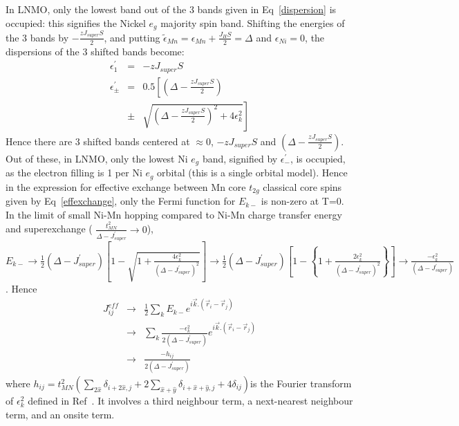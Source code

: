 \documentclass[english,aps,prb,twocolumn,showpacs]{revtex4-1}
\begin{document}
In LNMO, only the lowest band out of the 3 bands 
 given in Eq~\ref{dispersion} is occupied: this signifies the Nickel $e_{g}$ 
majority spin band. Shifting
the energies of the 3 bands by $-\frac{zJ_{super}S}{2}$, and putting 
$\tilde{\epsilon}_{Mn}=\epsilon_{Mn}+\frac{J_{H}S}{2}=\Delta$ and $\epsilon_{Ni}=0$,
 the dispersions of the 3 shifted
 bands become:
\begin{eqnarray}
\epsilon^{\prime}_{1}&=&-zJ_{super}S \nonumber \\
\epsilon^{\prime}_{\pm}&=&0.5\left[\left(\Delta-\frac{zJ_{super}S}{2}\right)\right. \nonumber \\
&\pm&\left.\sqrt{\left(\Delta-\frac{zJ_{super}S}{2}\right)^{2}+4\epsilon_{k}^{2}}\right]
\end{eqnarray}
Hence there are 3 shifted bands centered at $\approx 0$, $-zJ_{super}S$ and $\left(\Delta-\frac{zJ_{super}S}{2}\right)$.
Out of these, in LNMO, only the lowest Ni $e_{g}$ band, signified by $\epsilon^{\prime}_{-}$, is occupied, as the 
electron filling is 1 per Ni $e_{g}$ orbital (this is a single orbital model).
Hence in the expression for effective exchange between Mn core $t_{2g}$ classical core spins
 given by Eq~\ref{effexchange},
  only the Fermi function for $E_{k-}$ is non-zero at T=0.
In the limit of small Ni-Mn hopping compared to Ni-Mn charge transfer energy and superexchange ( 
$\frac{t_{MN}^{2}}{\Delta-J_{super}^{\prime}}\rightarrow 0$), 
$E_{k-}\rightarrow\frac{1}{2}\left(\Delta-J_{super}^{\prime}\right)\left[1-\sqrt{1+\frac{4\epsilon_{k}^{2}}{\left(\Delta-
J_{super}^{\prime}\right)^{2}}}\right]
\rightarrow\frac{1}{2}\left(\Delta-J_{super}^{\prime}\right)\left[1-\left\{1+\frac{2\epsilon_{k}^{2}}{\left(\Delta-
J_{super}^{\prime}\right)^{2}}\right\}\right] 
\rightarrow\frac{-\epsilon_{k}^{2}}{\left(\Delta-
J_{super}^{\prime}\right)}$.
 Hence 
\begin{eqnarray}
J^{eff}_{ij}&\rightarrow&\frac{1}{2}\sum_{k}E_{k-}e^{i\vec{k}.(\vec{r}_{i}-\vec{r}_{j})} \nonumber \\
&\rightarrow&\sum_{k}\frac{-\epsilon_{k}^{2}}{2(\Delta-J_{super}^{\prime})}e^{i\vec{k}.(\vec{r}_{i}-\vec{r}_{j})} \nonumber \\
&\rightarrow& \frac{-h_{ij}}{2(\Delta-J_{super}^{\prime})}
\label{Jijapprox}
\end{eqnarray}
where $h_{ij}=t_{MN}^{2}(\sum_{2\hat{x}}\delta_{i+2\hat{x},j}+2\sum_{\hat{x}+\hat{y}}\delta_{i+\hat{x}+\hat{y},j}+4\delta_{ij})$is the Fourier transform of $\epsilon_{k}^{2}$ defined in Ref~\cite{mePinaki}. It involves a third neighbour
 term, a next-nearest neighbour term, and an onsite term.
\end{document}
